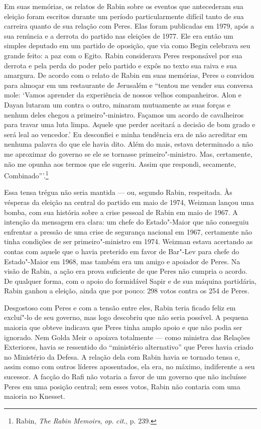 Em suas memórias, os relatos de Rabin sobre os eventos que antecederam
sua eleição foram escritos durante um período particularmente difícil
tanto de sua carreira quanto de sua relação com Peres. Elas foram
publicadas em 1979, após a sua renúncia e a derrota do partido nas
eleições de 1977. Ele era então um simples deputado em um partido de
oposição, que via como Begin celebrava seu grande feito: a paz com o
Egito. Rabin considerava Peres responsável por sua derrota e pela perda
do poder pelo partido e expôs no texto sua raiva e sua amargura. De
acordo com o relato de Rabin em suas memórias, Peres o convidou para
almoçar em um restaurante de Jerusalém e ``tentou me vender sua conversa
mole: `Vamos aprender da experiência de nossos velhos companheiros. Alon
e Dayan lutaram um contra o outro, minaram mutuamente as suas forças e
nenhum deles chegou a primeiro"-ministro. Façamos um acordo de
cavalheiros para travar uma luta limpa. Aquele que perder aceitará a
decisão de bom grado e será leal ao vencedor.' Eu desconfiei e minha
tendência era de não acreditar em nenhuma palavra do que ele havia dito.
Além do mais, estava determinado a não me aproximar do governo se ele se
tornasse primeiro"-ministro. Mas, certamente, não me opunha aos termos
que ele sugeriu. Assim que respondi, secamente, Combinado'''.\footnote{Rabin, \emph{The Rabin Memoirs}, \emph{op}. \emph{cit}., p. 239.}

Essa tensa trégua não seria mantida --- ou, segundo Rabin, respeitada. Às
vésperas da eleição na central do partido em maio de 1974, Weizman
lançou uma bomba, com sua história sobre a crise pessoal de Rabin em maio
de 1967. A intenção da mensagem era clara: um chefe do Estado"-Maior que
não conseguiu enfrentar a pressão de uma crise de segurança nacional em
1967, certamente não tinha condições de ser primeiro"-ministro em 1974.
Weizman estava acertando as contas com aquele que o havia preterido em
favor de Bar"-Lev para chefe do Estado"-Maior em 1968, mas também era um
amigo e apoiador de Peres. Na visão de Rabin, a ação era prova
suficiente de que Peres não cumpria o acordo. De qualquer forma, com o
apoio do formidável Sapir e de sua máquina partidária, Rabin ganhou a
eleição, ainda que por pouco: 298 votos contra os 254 de Peres.

Desgostoso com Peres e com a tensão entre eles, Rabin teria ficado feliz em
excluí"-lo de seu governo, mas logo descobriu que não seria possível. A
pequena maioria que obteve indicava que Peres tinha amplo apoio e que não
podia ser ignorado. Nem Golda Meir o apoiava totalmente ---
como ministra das Relações Exteriores, havia se ressentido do ``ministério
alternativo'' que Peres havia criado no Ministério da Defesa. A relação
dela com Rabin havia se tornado tensa e, assim como com outros líderes
aposentados, ela era, no máximo, indiferente a seu sucessor. A facção do
Rafi não votaria a favor de um governo que não incluísse Peres em uma
posição central; sem esses votos, Rabin não contaria com uma
maioria no Knesset.

